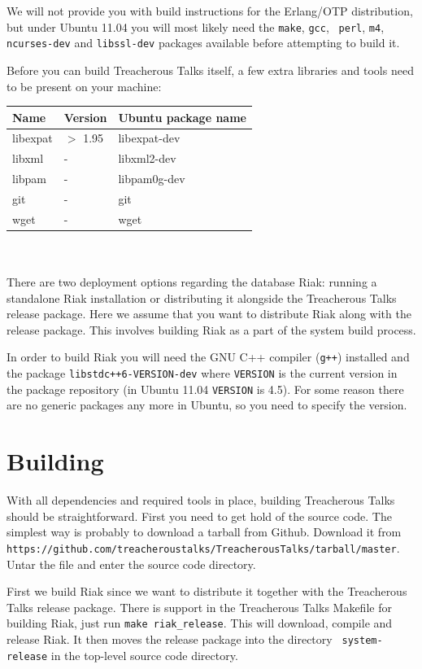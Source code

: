 \documentclass[11pt,a4paper]{report}
\begin{document}
We will not provide you with build instructions for the Erlang/OTP distribution,
but under Ubuntu 11.04 you will most likely need the {\tt make}, {\tt gcc}, {\tt
  perl}, {\tt m4}, {\tt ncurses-dev} and {\tt libssl-dev} packages available
before attempting to build it.

Before you can build Treacherous Talks itself, a few extra libraries and tools
need to be present on your machine: \\

\begin{tabular}{lll}
  Name & Version & Ubuntu package name \\ \hline
  libexpat & $>$ 1.95 & libexpat-dev \\
  libxml   & -        & libxml2-dev \\
  libpam   & -        & libpam0g-dev \\
  git      & -        & git \\
  wget     & -        & wget \\
\end{tabular} \\
\\
There are two deployment options regarding the database Riak: running a
standalone Riak installation or distributing it alongside the Treacherous Talks
release package. Here we assume that you want to distribute Riak along with the
release package. This involves building Riak as a part of the system build
process.

In order to build Riak you will need the GNU C++ compiler ({\tt g++}) installed
and the package {\tt libstdc++6-VERSION-dev} where {\tt VERSION} is the current
version in the package repository (in Ubuntu 11.04 {\tt VERSION} is 4.5). For
some reason there are no generic packages any more in Ubuntu, so you need to
specify the version.
\section{Building}
With all dependencies and required tools in place, building Treacherous Talks
should be straightforward. First you need to get hold of the source code. The
simplest way is probably to download a tarball from Github. Download it from {\tt
  https://github.com/treacheroustalks/Treacherous\-Talks/tarball/master}.  Untar
the file and enter the source code directory.

First we build Riak since we want to distribute it together with the Treacherous
Talks release package. There is support in the Treacherous Talks Makefile for
building Riak, just run {\tt make riak\_release}. This will download, compile
and release Riak. It then moves the release package into the directory {\tt
  system-release} in the top-level source code directory.
\end{document}
